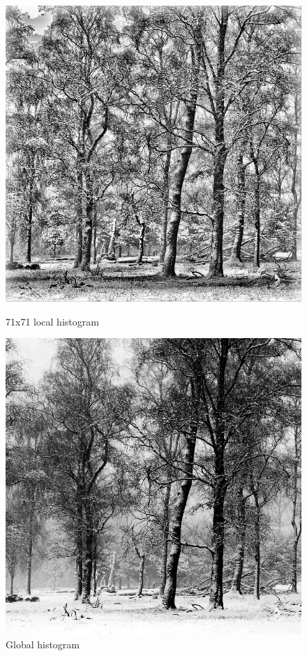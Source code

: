 \documentclass{article}
\begin{document}
\newpage
\begin{figure}[!htb]
    \centering
    \begin{minipage}[b]{0.45\textwidth}
        \includegraphics[width=\textwidth]{LC2_local_71.jpg}
        \caption{71x71 local histogram}
    \end{minipage}
    \begin{minipage}[b]{0.45\textwidth}
        \includegraphics[width=\textwidth]{LC2_global.png}
        \caption{Global histogram}
    \end{minipage}
\end{figure}
\end{document}
